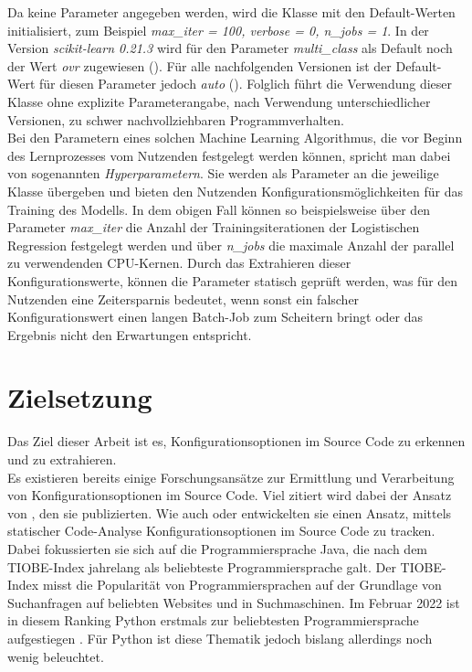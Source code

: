 \documentclass[german,bachelor]{swsLeipzig}
\begin{document}
Da keine Parameter angegeben werden, wird die Klasse mit den Default-Werten initialisiert, zum Beispiel
\textit{max\_iter = 100, verbose = 0, n\_jobs = 1}.
In der Version \textit{scikit-learn 0.21.3} wird für den Parameter \textit{multi\_class} als Default noch der Wert \textit{ovr} zugewiesen (\citeyear{sklearn}).
Für alle nachfolgenden Versionen ist der Default-Wert für diesen Parameter jedoch \textit{auto} (\citeyear{sklearn}).
Folglich führt die Verwendung dieser Klasse ohne explizite Parameterangabe, nach Verwendung unterschiedlicher Versionen, zu schwer nachvollziehbaren Programmverhalten.\\

Bei den Parametern eines solchen Machine Learning Algorithmus, die vor Beginn des Lernprozesses vom Nutzenden festgelegt werden können,
spricht man dabei von sogenannten \textit{Hyperparametern}.
Sie werden als Parameter an die jeweilige Klasse übergeben und bieten den Nutzenden Konfigurationsmöglichkeiten für
das Training des Modells.
In dem obigen Fall können so beispielsweise über den Parameter \textit{max\_iter} die Anzahl der Trainingsiterationen
der Logistischen Regression festgelegt werden und über \textit{n\_jobs} die maximale Anzahl der parallel zu verwendenden CPU-Kernen.
Durch das Extrahieren dieser Konfigurationswerte, können die Parameter statisch geprüft werden, was für den Nutzenden
eine Zeitersparnis bedeutet, wenn sonst ein falscher Konfigurationswert einen langen Batch-Job zum Scheitern bringt
oder das Ergebnis nicht den Erwartungen entspricht. \\

\section{Zielsetzung}
Das Ziel dieser Arbeit ist es, Konfigurationsoptionen im Source Code zu erkennen und zu extrahieren. \\

Es existieren bereits einige Forschungsansätze zur Ermittlung und Verarbeitung von Konfigurationsoptionen im Source Code.
Viel zitiert wird dabei der Ansatz von \citeauthor{10.1145/1985793.1985812}, den sie \citeyear{10.1145/1985793.1985812} publizierten.
Wie auch \citeauthor{7774519} oder \citeauthor{8049300} entwickelten sie einen Ansatz, mittels statischer Code-Analyse Konfigurationsoptionen
im Source Code zu tracken.
Dabei fokussierten sie sich auf die Programmiersprache Java, die nach dem TIOBE-Index jahrelang als beliebteste Programmiersprache galt.
Der TIOBE-Index misst die Popularität von Programmiersprachen auf der Grundlage von Suchanfragen auf beliebten Websites und in Suchmaschinen.
Im Februar 2022 ist in diesem Ranking Python erstmals zur beliebtesten Programmiersprache aufgestiegen \cite[]{enwiki:1077809155}.
Für Python ist diese Thematik jedoch bislang allerdings noch wenig beleuchtet. \\
\end{document}
